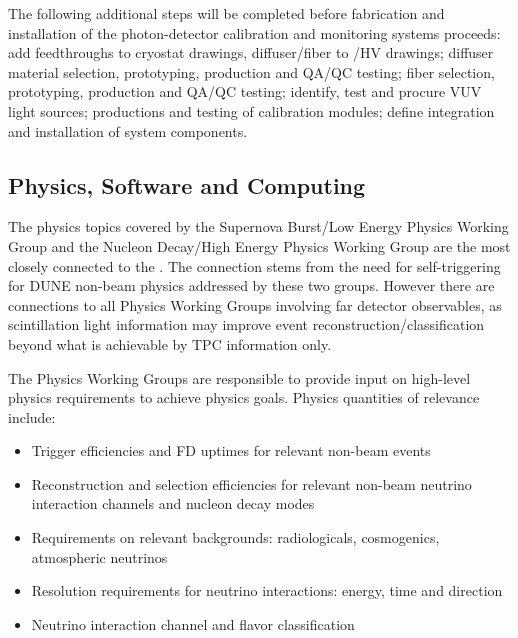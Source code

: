 The following additional steps will be completed before fabrication and installation of the photon-detector calibration and monitoring systems proceeds: add feedthroughs to cryostat drawings, diffuser/fiber to /HV drawings; diffuser material selection, prototyping, production and QA/QC testing; fiber selection, prototyping, production and QA/QC testing; identify, test and procure VUV light sources; productions and testing of calibration modules; define integration and installation of system components.


\subsection{Physics, Software and Computing}


The physics topics covered by the Supernova Burst/Low Energy Physics Working Group and the Nucleon Decay/High Energy Physics Working Group are the most closely connected to the \single {}. The connection stems from the need for self-triggering for DUNE non-beam physics addressed by these two groups. 
However there are connections to all Physics Working Groups involving far detector observables, as scintillation light information may improve event reconstruction/classification beyond what is achievable by TPC information only. 


The Physics Working Groups are responsible to provide input on high-level physics requirements to achieve physics goals. Physics quantities of relevance include:

\begin{itemize}
    \item Trigger efficiencies and FD uptimes for relevant non-beam events
    \item Reconstruction and selection efficiencies for relevant non-beam neutrino interaction channels and nucleon decay modes
    \item Requirements on relevant backgrounds: radiologicals, cosmogenics, atmospheric neutrinos
    \item Resolution requirements for neutrino interactions: energy, time and direction
    \item Neutrino interaction channel and flavor classification 
\end{itemize}

